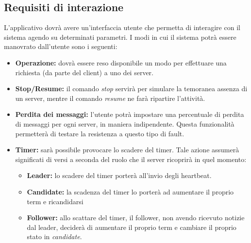 	\subsection{Requisiti di interazione}
	L'applicativo dovrà avere un'interfaccia utente che permetta di interagire con il sistema agendo su determinati parametri. I modi in cui il sistema potrà essere manovrato dall'utente sono i seguenti:
		\begin{itemize}
			\item \textbf{Operazione:} dovrà essere reso disponibile un modo per effettuare una richiesta (da parte del client) a uno dei server.
			\item \textbf{Stop/Resume:} il comando \textit{stop} servirà per simulare la temoranea assenza di un server, mentre il comando \textit{resume} ne farà ripartire l'attività. 
			\item \textbf{Perdita dei messaggi:} l'utente potrà impostare una percentuale di perdita di messaggi per ogni server, in maniera indipendente. Questa funzionalità permetterà di testare la resistenza a questo tipo di fault.
			\item \textbf{Timer:} sarà possibile provocare lo scadere del timer. Tale azione assumerà significati di versi a seconda del ruolo che il server ricoprirà in quel momento:
				\begin{itemize}
					\item \textbf{Leader:} lo scadere del timer porterà all'invio degli heartbeat.
					\item \textbf{Candidate:} la scadenza del timer lo porterà ad aumentare il proprio term e ricandidarsi
					\item \textbf{Follower:} allo scattare del timer, il follower, non avendo ricevuto notizie dal leader, deciderà di aumentare il proprio term e cambiare il proprio stato in \textit{candidate}.
				\end{itemize}

		\end{itemize}